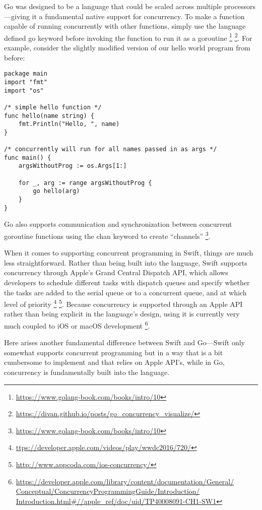 \documentclass[letterpaper]{article}
\begin{document}
Go was designed to be a language that could be scaled across multiple processors—giving it a fundamental native support for concurrency. To make a function capable of running concurrently with other functions, simply use the language defined go keyword before invoking the function to run it as a goroutine \footnote{\url{https://www.golang-book.com/books/intro/10}} \footnote{\url{https://divan.github.io/posts/go_concurrency_visualize/}}. For example, consider the slightly modified version of our hello world program from before:

\begin{verbatim}
package main
import "fmt"
import "os"

/* simple hello function */
func hello(name string) {
    fmt.Println("Hello, ", name)
}

/* concurrently will run for all names passed in as args */
func main() {
    argsWithoutProg := os.Args[1:]

    for _, arg := range argsWithoutProg {
        go hello(arg)
    }
}
\end{verbatim}

Go also supports communication and synchronization between concurrent goroutine functions using the chan keyword to create “channels” \footnote{\url{https://www.golang-book.com/books/intro/10}}.

When it comes to supporting concurrent programming in Swift, things are much less straightforward. Rather than being built into the language, Swift supports concurrency through Apple’s Grand Central Dispatch API, which allows developers to schedule different tasks with dispatch queues and specify whether the tasks are added to the serial queue or to a concurrent queue, and at which level of priority \footnote{\url{ttps://developer.apple.com/videos/play/wwdc2016/720/}} \footnote{\url{http://www.appcoda.com/ios-concurrency/}}. Because concurrency is supported through an Apple API rather than being explicit in the language’s  design, using it is currently very much coupled to iOS or macOS development \footnote{\url{https://developer.apple.com/library/content/documentation/General/
Conceptual/ConcurrencyProgrammingGuide/Introduction/
Introduction.html#//apple_ref/doc/uid/TP40008091-CH1-SW1}}.

Here arises another fundamental difference between Swift and Go—Swift only somewhat supports concurrent programming but in a way that is a bit cumbersome to implement and that relies on Apple API's, while in Go, concurrency is fundamentally built into the language.
\end{document}
